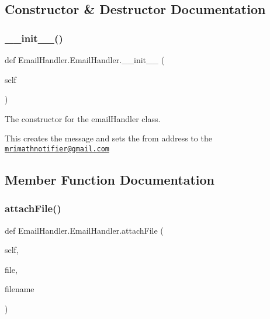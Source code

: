 \subsection{Constructor \& Destructor Documentation}
\mbox{\label{classEmailHandler_1_1EmailHandler_ac820eeb8d982e9e9eb3ef60fbe25a4ac}} 
\subsubsection{\texorpdfstring{\+\_\+\+\_\+init\+\_\+\+\_\+()}{\_\_init\_\_()}}
{\footnotesize\ttfamily def Email\+Handler.\+Email\+Handler.\+\_\+\+\_\+init\+\_\+\+\_\+ (\begin{DoxyParamCaption}\item[{}]{self }\end{DoxyParamCaption})}



The constructor for the email\+Handler class. 

This creates the message and sets the from address to the \href{mailto:mrimathnotifier@gmail.com}{\tt mrimathnotifier@gmail.\+com} 

\subsection{Member Function Documentation}
\mbox{\label{classEmailHandler_1_1EmailHandler_aeafa5d9ec69ed3459fb5f95804081b30}} 
\subsubsection{\texorpdfstring{attach\+File()}{attachFile()}}
{\footnotesize\ttfamily def Email\+Handler.\+Email\+Handler.\+attach\+File (\begin{DoxyParamCaption}\item[{}]{self,  }\item[{}]{file,  }\item[{}]{filename }\end{DoxyParamCaption})}



